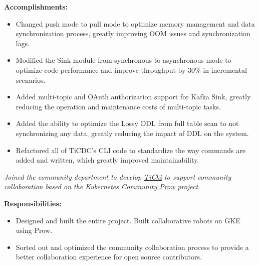 \documentclass{software_engineer_rustin_liu}
\newcommand{\en}[1]{#1}
\newcommand{\zh}[1]{}
\begin{document}
\en{\textbf{Accomplishments:}}
\zh{\textbf{产出：}}
\begin{itemize}
      \item \en{Changed push mode to pull mode to optimize memory management and data synchronization process, greatly improving OOM issues and synchronization lags.}
            \zh{将推送模式修改为了拉取模式优化了内存管理和数据同步流程，极大的改善了 OOM 问题和同步延迟。}
      \item \en{Modified the Sink module from synchronous to asynchronous mode to optimize code performance and improve throughput by 30\% in incremental scenarios.}
            \zh{将 Sink 模块从同步模式修改为异步模式，优化代码性能，将增量场景下吞吐提升 30\%。}
      \item \en{ Added multi-topic and OAuth authorization support for Kafka Sink, greatly reducing the operation and maintenance costs of multi-topic tasks.}
            \zh{为 Kafka Sink 支持了多 Topic 和 OAuth 授权功能，极大的降低了多 Topic 的任务运维成本。}
      \item \en{Added the ability to optimize the Lossy DDL from full table scan to not synchronizing any data, greatly reducing the impact of DDL on the system.}
            \zh{将有损 DDL 从全表扫描优化为不同步任何数据，极大的降低了有损 DDL 对系统的影响。}
      \item \en{Refactored all of TiCDC’s CLI code to standardize the way commands are added and written, which greatly improved maintainability.}
            \zh{重构了 TiCDC 的 CLI 所有代码，标准化了命令添加和编写方式，极大提升了可维护性。}
\end{itemize}
\en{}
\zh{\datedsubsection{\textbf{\href{https://pingcap.com/zh/}{PingCAP Inc. - 数据库 - 前后端开发工程师}}}{2020/08 -- 2021/07}}
\en{\textsl{Joined the community department to develop {\href{https://github.com/ti-community-infra/tichi}{TiChi}} to support community collaboration based on the Kubernetes Community{\href{https://github.com/kubernetes/test-infra/tree/master/prow}{ Prow}} project.}}
\zh{\textsl{加入了社区部门，以 Kubernetes 社区{\href{https://github.com/kubernetes/test-infra/tree/master/prow}{ Prow}} 项目为基础开发{\href{https://github.com/ti-community-infra/tichi}{ TiChi}} 来支撑社区协作。}}

\en{\textbf{Responsibilities:}}
\zh{\textbf{职责：}}
\begin{itemize}
      \item \en{Designed and built the entire project. Built collaborative robots on GKE using Prow.}
            \zh{从零开始设计和构建整个项目，使用 Prow 在 GKE 上搭建协作机器人。}
      \item \en{Sorted out and optimized the community collaboration process to provide a better collaboration experience for open source contributors.}
            \zh{负责社区协作流程的梳理和优化，为开源贡献者提供更好的协作体验。}
\end{itemize}
\end{document}
